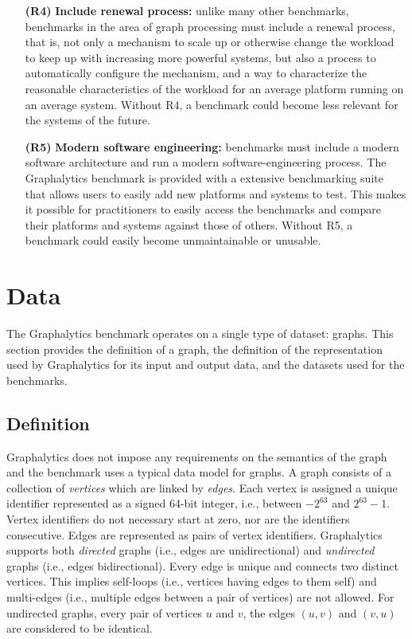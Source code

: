 \begin{itemize}
\item[\textbf{(R4)}] \textbf{Include renewal process:} unlike many other benchmarks, benchmarks in the area of graph processing must include a renewal process, that is, not only a mechanism to scale up or otherwise change the workload to keep up with increasing more powerful systems, but also a process to automatically configure the mechanism, and a way to characterize the reasonable characteristics of the workload for an average platform running on an average system. Without R4, a benchmark could become less relevant for the systems of the future.

\item[\textbf{(R5)}] \textbf{Modern software engineering:} benchmarks must include a modern software architecture and run a modern software-engineering process. The Graphalytics benchmark is provided with a extensive benchmarking suite that allows users to easily add new platforms and systems to test. This makes it possible for practitioners to easily access the benchmarks and compare their platforms and systems against those of others. Without R5, a benchmark could easily become unmaintainable or unusable.
\end{itemize}


\section{Data}
The Graphalytics benchmark operates on a single type of dataset: graphs. This section provides the definition of a graph, the definition of the representation used by Graphalytics for its input and output data, and the datasets used for the benchmarks.

\subsection{Definition}
Graphalytics does not impose any requirements on the semantics of the graph and the benchmark uses a typical data model for graphs. A graph consists of a collection of \emph{vertices} which are linked by \emph{edges}.  Each vertex is assigned a unique identifier represented as a signed 64-bit integer, i.e., between $-2^{63}$ and $2^{63}-1$. Vertex identifiers do not necessary start at zero, nor are the identifiers consecutive. Edges are represented as pairs of vertex identifiers. Graphalytics supports both \emph{directed} graphs (i.e., edges are unidirectional) and \emph{undirected} graphs (i.e., edges bidirectional). Every edge is unique and connects two distinct vertices. This implies self-loops (i.e., vertices having edges to them self) and multi-edges (i.e., multiple edges between a pair of vertices) are not allowed. For undirected graphs, every pair of vertices $u$ and $v$, the edges $(u,v)$ and $(v,u)$ are considered to be identical.

